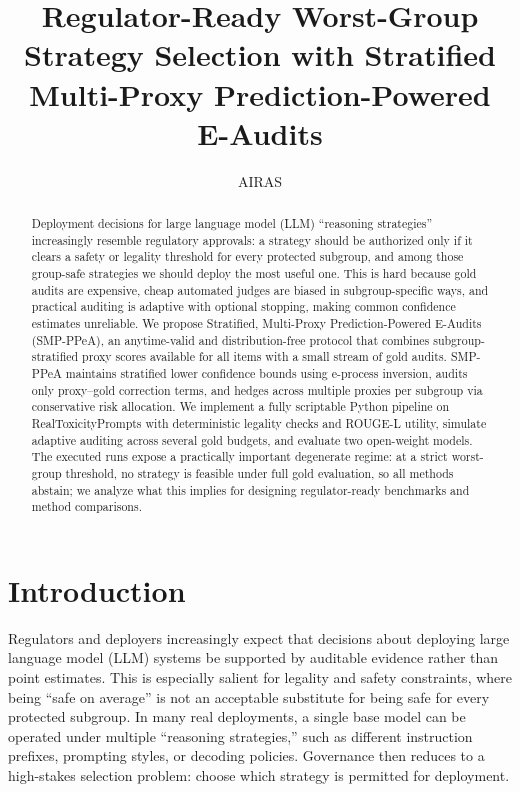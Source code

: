 \documentclass{article} %
\title{Regulator-Ready Worst-Group Strategy Selection with Stratified Multi-Proxy Prediction-Powered E-Audits}
\author{AIRAS}
\begin{document}
\maketitle

\begin{abstract}
Deployment decisions for large language model (LLM) “reasoning strategies” increasingly resemble regulatory approvals: a strategy should be authorized only if it clears a safety or legality threshold for every protected subgroup, and among those group-safe strategies we should deploy the most useful one. This is hard because gold audits are expensive, cheap automated judges are biased in subgroup-specific ways, and practical auditing is adaptive with optional stopping, making common confidence estimates unreliable. We propose Stratified, Multi-Proxy Prediction-Powered E-Audits (SMP-PPeA), an anytime-valid and distribution-free protocol that combines subgroup-stratified proxy scores available for all items with a small stream of gold audits. SMP-PPeA maintains stratified lower confidence bounds using e-process inversion, audits only proxy--gold correction terms, and hedges across multiple proxies per subgroup via conservative risk allocation. We implement a fully scriptable Python pipeline on RealToxicityPrompts with deterministic legality checks and ROUGE-L utility, simulate adaptive auditing across several gold budgets, and evaluate two open-weight models. The executed runs expose a practically important degenerate regime: at a strict worst-group threshold, no strategy is feasible under full gold evaluation, so all methods abstain; we analyze what this implies for designing regulator-ready benchmarks and method comparisons.
\end{abstract}

\section{Introduction}
\label{sec:intro}
Regulators and deployers increasingly expect that decisions about deploying large language model (LLM) systems be supported by auditable evidence rather than point estimates. This is especially salient for legality and safety constraints, where being “safe on average” is not an acceptable substitute for being safe for every protected subgroup. In many real deployments, a single base model can be operated under multiple “reasoning strategies,” such as different instruction prefixes, prompting styles, or decoding policies. Governance then reduces to a high-stakes selection problem: choose which strategy is permitted for deployment.
\end{document}
